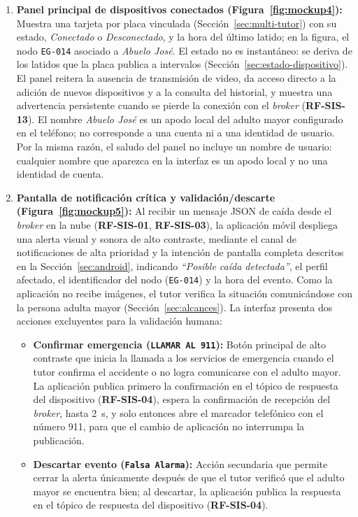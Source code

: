 \documentclass[12pt,a4paper,oneside]{book}
\theoremstyle{plain}
\theoremstyle{definition}
\theoremstyle{remark}
\begin{document}
\begin{enumerate}
    \item \textbf{Panel principal de dispositivos conectados (Figura~\ref{fig:mockup4}):} Muestra una tarjeta por placa vinculada (Sección~\ref{sec:multi-tutor}) con su estado, \textit{Conectado} o \textit{Desconectado}, y la hora del último latido; en la figura, el nodo \texttt{EG-014} asociado a \textit{Abuelo José}. El estado no es instantáneo: se deriva de los latidos que la placa publica a intervalos (Sección~\ref{sec:estado-dispositivo}). El panel reitera la ausencia de transmisión de video, da acceso directo a la adición de nuevos dispositivos y a la consulta del historial, y muestra una advertencia persistente cuando se pierde la conexión con el \textit{broker} (\textbf{RF-SIS-13}). El nombre \textit{Abuelo José} es un apodo local del adulto mayor configurado en el teléfono; no corresponde a una cuenta ni a una identidad de usuario. Por la misma razón, el saludo del panel no incluye un nombre de usuario: cualquier nombre que aparezca en la interfaz es un apodo local y no una identidad de cuenta.
    \item \textbf{Pantalla de notificación crítica y validación/descarte (Figura~\ref{fig:mockup5}):} Al recibir un mensaje JSON de caída desde el \textit{broker} en la nube (\textbf{RF-SIS-01}, \textbf{RF-SIS-03}), la aplicación móvil despliega una alerta visual y sonora de alto contraste, mediante el canal de notificaciones de alta prioridad y la intención de pantalla completa descritos en la Sección~\ref{sec:android}, indicando \textit{``Posible caída detectada''}, el perfil afectado, el identificador del nodo (\texttt{EG-014}) y la hora del evento. Como la aplicación no recibe imágenes, el tutor verifica la situación comunicándose con la persona adulta mayor (Sección~\ref{sec:alcances}). La interfaz presenta dos acciones excluyentes para la validación humana:
    \begin{itemize}
        \item \textbf{Confirmar emergencia (\texttt{LLAMAR AL 911}):} Botón principal de alto contraste que inicia la llamada a los servicios de emergencia cuando el tutor confirma el accidente o no logra comunicarse con el adulto mayor. La aplicación publica primero la confirmación en el tópico de respuesta del dispositivo (\textbf{RF-SIS-04}), espera la confirmación de recepción del \textit{broker}, hasta 2~s, y solo entonces abre el marcador telefónico con el número 911, para que el cambio de aplicación no interrumpa la publicación.
        \item \textbf{Descartar evento (\texttt{Falsa Alarma}):} Acción secundaria que permite cerrar la alerta únicamente después de que el tutor verificó que el adulto mayor se encuentra bien; al descartar, la aplicación publica la respuesta en el tópico de respuesta del dispositivo (\textbf{RF-SIS-04}).

\end{itemize}
\end{enumerate}
\end{document}
